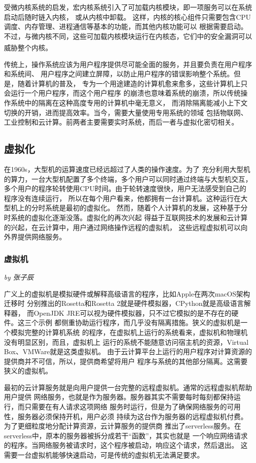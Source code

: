 \documentclass[UTF8,fontset=none,linespread=1.15]{ctexart}
\let\nosupcite\cite
\renewcommand*{\cite}[1]{\textsuperscript{\nosupcite{#1}}}
\newcommand{\sectionauthor}[1]{%
\vspace*{-5ex}
\noindent\textrm{\hfill\textit{by #1}}
\vspace*{2ex}\par}
\begin{document}
受微内核系统的启发，宏内核系统引入了可加载内核模块，即一项服务可以在系统启动后随时链入内核，
或从内核中卸载。
这样，内核的核心组件只需要包含CPU调度、内存管理、进程通信等基本的功能，而其他内核功能可以
根据需要启动。不过，与微内核不同，这些可加载内核模块运行在内核态，它们中的安全漏洞可以
威胁整个内核。\cite{bib:os-concept}

传统上，操作系统应该为用户程序提供尽可能全面的服务，并且要负责在用户程序和系统间、
用户程序之间建立屏障，以防止用户程序的错误影响整个系统。但是，随着计算机的普及，
专为一个用途建造的计算机愈来愈多，这些计算机上只会运行一个用户程序，而这个用户程序
的崩溃也意味着系统的崩溃，所以传统操作系统中的隔离在这种高度专用的计算机中毫无意义，
而消除隔离能减小上下文切换的开销，进而提高效率。当今，需要大量使用专用系统的领域
包括物联网、工业控制和云计算。前两者主要需要实时系统，而后一者与虚拟化密切相关。

\subsection{虚拟化}
在1960s，大型机的运算速度已经远超过了人类的操作速度。为了
充分利用大型机的算力，一台大型机配置了多个终端，多个用户可以同时通过终端与大型机交互，
多个用户的程序轮转使用CPU时间。由于轮转速度很快，用户无法感受到自己的程序没有连续运行，
所以在每个用户看来，他都拥有一台计算机。这种运行在大型机上的分时系统是最初的虚拟化。
然而，随着个人计算机的发展，这种基于分时系统的虚拟化逐渐没落。虚拟化的再次兴起
得益于互联网技术的发展和云计算的兴起，在云计算中，用户通过网络操作远程的虚拟机，
这些远程虚拟机可以向外界提供网络服务。

\subsubsection{虚拟机}\sectionauthor{张子辰}
广义上的虚拟机是模拟硬件或解释高级语言的程序，比如Apple在两次macOS架构迁移时
分别推出的Rosetta和Rosetta 2就是硬件模拟器，CPython就是高级语言解释器，
而OpenJDK JRE可以视为硬件模拟器，只不过它模拟的是不存在的硬件。这三个示例
都侧重协助运行程序，而几乎没有隔离措施。狭义的虚拟机是一个模拟完整的计算机系统
的程序，在虚拟机上运行的系统看来，虚拟机和物理机没有明显区别，而且，虚拟机上
运行的系统不能随意访问宿主机的资源，Virtual Box、VMWare就是这类虚拟机。
由于云计算平台上运行的用户程序对计算资源的提供商并不可信，所以，提供商希望将用户
程序与系统的其他部分隔离。这需要狭义的虚拟机。

最初的云计算服务就是向用户提供一台完整的远程虚拟机。通常的远程虚拟机帮助用户提供
网络服务，也就是作为服务器。服务器其实不需要每时每刻都保持运行，而只需要在有人请求这项网络
服务时运行，但是为了确保网络服务的可用性，服务器必须保持开机，用户必须
持续为这台作为服务器的远程虚拟机付费。为了更细粒度地分配计算资源，云计算服务的提供商
推出了serverless服务。在serverless中，原本的服务器被拆分成若干“函数”，其实也就是
一个响应网络请求的程序。当网络服务被请求时，这个程序被启动，响应这个请求，然后退出。
这需要一台虚拟机能够快速启动，可是传统的虚拟机无法满足要求。
\end{document}
